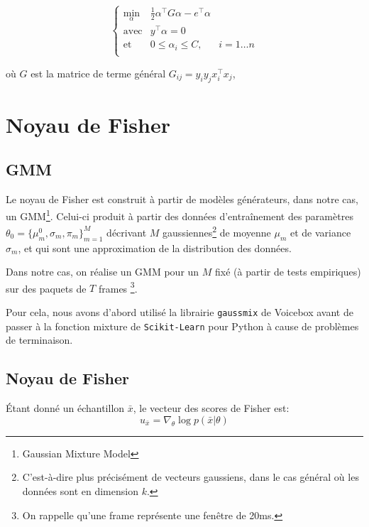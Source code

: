 \documentclass{article}
\begin{document}
\begin{equation}
  \label{eq:dualSVM}
  \left\{
    \begin{array}{lll}
      \displaystyle\min_{\alpha}& \frac{1}{2} \alpha^\top  G \alpha - e^\top  \alpha&\\
      \mbox{avec} &y^\top  \alpha = 0 &\\
      \mbox{et} &0 \leq \alpha_i \leq C,& i=1 \dots n \\
    \end{array}
  \right.
\end{equation}

où $G$ est la matrice de terme général $G_{ij} =  y_i y_j x_i^\top x_j$,

\section{Noyau de Fisher}
\label{fisher}
\subsection{GMM}
Le noyau de Fisher est construit à partir de modèles générateurs, dans notre cas, un GMM\footnote{Gaussian Mixture Model}.
Celui-ci produit à partir des données d'entraînement des paramètres $\theta_0 = \lbrace \mu_m^0, \sigma_m, \pi_m \rbrace_{m=1}^M$ décrivant $M$ gaussiennes\footnote{C'est-à-dire plus précisément de vecteurs gaussiens, dans le cas général où les données sont en dimension $k$.} de moyenne $\mu_m$ et de variance $\sigma_m$, et qui sont une approximation de la distribution des données.

Dans notre cas, on réalise un GMM pour un $M$ fixé (à partir de tests empiriques) sur des paquets de $T$ \og frames \fg \footnote{On rappelle qu'une frame représente une fenêtre de 20ms.}.

Pour cela, nous avons d'abord utilisé la librairie \texttt{gaussmix} de Voicebox avant de passer à la fonction mixture de \texttt{Scikit-Learn} pour Python à cause de problèmes de terminaison.
\subsection{Noyau de Fisher}
Étant donné un échantillon $\bar{x}$, le vecteur des scores de Fisher est:
\[u_{\bar{x}} = \nabla_{\theta} \log p (\bar{x} | \theta) \]
\end{document}
